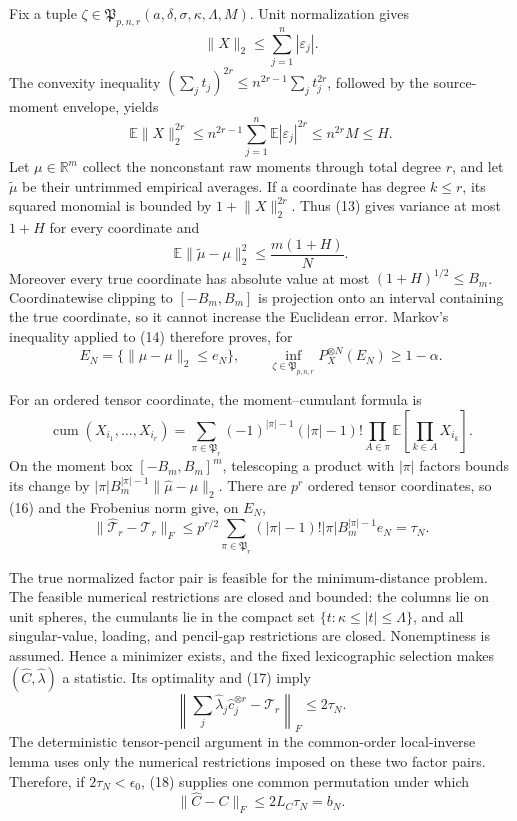 Fix a tuple \(\zeta\in\mathfrak P_{p,n,r}(a,\delta,\sigma,\kappa,\Lambda,M)\). Unit normalization gives
\[
 \lVert X\rVert_2\le\sum_{j=1}^n|\varepsilon_j|.
\]
The convexity inequality \((\sum_j t_j)^{2r}\le n^{2r-1}\sum_jt_j^{2r}\), followed by the source-moment envelope, yields
\[
 \mathbb E\lVert X\rVert_2^{2r}
 \le n^{2r-1}\sum_{j=1}^n\mathbb E|\varepsilon_j|^{2r}
 \le n^{2r}M\le H. \tag{13}
\]
Let \(\mu\in\mathbb R^m\) collect the nonconstant raw moments through total degree \(r\), and let \(\widetilde\mu\) be their untrimmed empirical averages. If a coordinate has degree \(k\le r\), its squared monomial is bounded by \(1+\lVert X\rVert_2^{2r}\). Thus (13) gives variance at most \(1+H\) for every coordinate and
\[
 \mathbb E\lVert\widetilde\mu-\mu\rVert_2^2
 \le\frac{m(1+H)}{N}. \tag{14}
\]
Moreover every true coordinate has absolute value at most \((1+H)^{1/2}\le B_m\). Coordinatewise clipping to \([-B_m,B_m]\) is projection onto an interval containing the true coordinate, so it cannot increase the Euclidean error. Markov's inequality applied to (14) therefore proves, for
\[
 E_N=\{\lVert\widehat\mu-\mu\rVert_2\le e_N\},
\qquad
 \inf_{\zeta\in\mathfrak P_{p,n,r}}P_X^{\otimes N}(E_N)\ge1-\alpha. \tag{15}
\]

For an ordered tensor coordinate, the moment--cumulant formula is
\[
 \operatorname{cum}(X_{i_1},\ldots,X_{i_r})
 =\sum_{\pi\in\mathfrak P_r}(-1)^{|\pi|-1}(|\pi|-1)!
   \prod_{A\in\pi}\mathbb E\!\left[\prod_{k\in A}X_{i_k}\right]. \tag{16}
\]
On the moment box \([-B_m,B_m]^m\), telescoping a product with \(|\pi|\) factors bounds its change by \(|\pi|B_m^{|\pi|-1}\lVert\widehat\mu-\mu\rVert_2\). There are \(p^r\) ordered tensor coordinates, so (16) and the Frobenius norm give, on \(E_N\),
\[
 \lVert\widehat{\mathcal T}_r-\mathcal T_r\rVert_F
 \le p^{r/2}\sum_{\pi\in\mathfrak P_r}(|\pi|-1)!|\pi|B_m^{|\pi|-1}e_N
 =\tau_N. \tag{17}
\]

The true normalized factor pair is feasible for the minimum-distance problem. The feasible numerical restrictions are closed and bounded: the columns lie on unit spheres, the cumulants lie in the compact set \(\{t:\kappa\le|t|\le\Lambda\}\), and all singular-value, loading, and pencil-gap restrictions are closed. Nonemptiness is assumed. Hence a minimizer exists, and the fixed lexicographic selection makes \((\widehat C,\widehat\lambda)\) a statistic. Its optimality and (17) imply
\[
 \left\lVert\sum_j\widehat\lambda_j\widehat c_j^{\otimes r}
       -\mathcal T_r\right\rVert_F
 \le 2\tau_N. \tag{18}
\]
The deterministic tensor-pencil argument in the common-order local-inverse lemma uses only the numerical restrictions imposed on these two factor pairs. Therefore, if \(2\tau_N<\epsilon_0\), (18) supplies one common permutation under which
\[
 \lVert\widehat C-C\rVert_F\le 2L_C\tau_N=b_N. \tag{19}
\]

